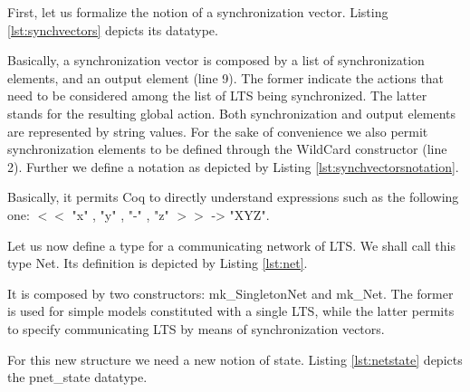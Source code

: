 		First, let us formalize the notion of a synchronization vector. Listing \ref{lst:synchvectors}
	depicts its datatype.	
	
			

	\noindent Basically, a synchronization vector is composed by a list of synchronization elements,
	and an output element (line 9). The former indicate the \textsf{actions} that need to be considered among
	the list of \ac{LTS} being synchronized. The latter stands for the resulting global action.  
	Both synchronization and output elements are represented by string values. For the sake of convenience
	we also permit synchronization elements to be defined through the \textsf{WildCard} constructor (line 2).
	Further we define a notation as depicted by Listing \ref{lst:synchvectorsnotation}.
	
		
                      	
    \noindent Basically, it permits Coq to directly understand expressions such 
    as the following one: \textsf{$<<$ "x" , "y" , "-" , "z" $>>$ -> "XYZ"}.

	Let us now define a type for a communicating network of \ac{LTS}. We shall call this type \textsf{Net}.
	Its definition is depicted by Listing \ref{lst:net}.	

		

	\noindent It is composed by two constructors: \textsf{mk\_SingletonNet} and \textsf{mk\_Net}.
	The former is used for simple models constituted with a single \ac{LTS}, while the latter
	permits to specify communicating \ac{LTS} by means of synchronization vectors.
	
	For this new structure we need a new notion of state. Listing \ref{lst:netstate} depicts the \textsf{pnet\_state}
	datatype.

		


